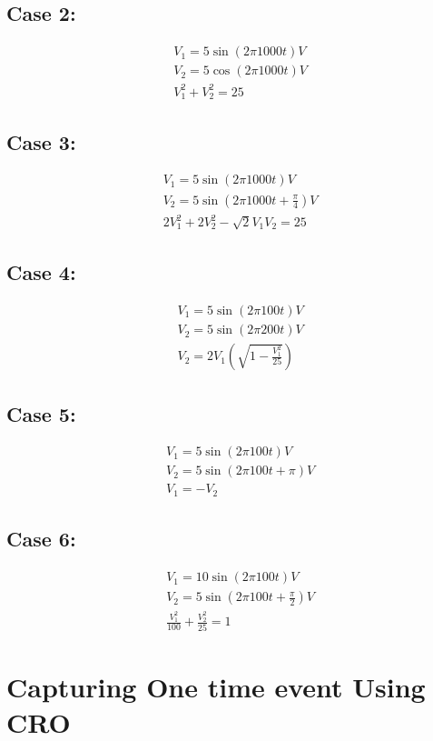 \documentclass[a4paper,12pt]{article}
\begin{document}
\subsection{Case 2:}
\begin{align*}
    &V_1=5\sin(2\pi 1000t)V\\
    &V_2=5\cos(2\pi 1000t)V\\
    &V_1^2+V_2^2=25
\end{align*}

\subsection{Case 3:}

\begin{align*}
    &V_1=5\sin(2\pi 1000t)V\\
    &V_2=5\sin(2\pi 1000t+\frac{\pi}{4})V\\
    &2V_1^2+2V_2^2-\sqrt{2}V_1V_2=25
\end{align*}
\subsection{Case 4:}
\begin{align*}
    &V_1=5\sin(2\pi 100t)V\\
    &V_2=5\sin(2\pi 200t)V\\
    &V_2=2V_1(\sqrt{1-\frac{V_1^2}{25}})
\end{align*}


\subsection{Case 5:}
\begin{align*}
    &V_1=5\sin(2\pi 100t)V\\
    &V_2=5\sin(2\pi 100t+\pi )V\\
    &V_1=-V_2
\end{align*}



\subsection{Case 6:}
\begin{align*}
    &V_1=10\sin(2\pi 100t)V\\
    &V_2=5\sin(2\pi 100t+\frac{\pi}{2})V\\
    &\frac{V_1^2}{100}+\frac{V_2^2}{25}=1
\end{align*}


\section{Capturing One time event Using CRO}
\end{document}
